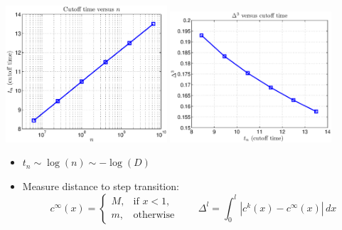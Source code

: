 \documentclass[12pt,t]{beamer}
\begin{document}
\begin{frame}
   \begin{center}
     \includegraphics[width=0.45\textwidth,trim=1cm 1cm 0cm 0cm]{cutofftimevsD2}
     \includegraphics[width=0.45\textwidth,trim=1cm 1cm 0cm 0cm]{areavscutofftime2}
   \end{center}
    \begin{itemize}
    \item $t_n \sim \log(n) \sim -\log(D)$
    \item Measure distance to step transition:
     \begin{equation*}
       c^{\infty}(x) = \begin{cases}
         M, &\text{if } x < 1, \\
         m, &\text{otherwise}
       \end{cases}
      \qquad
      \Delta^l = \int_0^l | c^k(x)-c^{\infty}(x)|\,dx
    \end{equation*}
  \end{itemize}

\end{frame}
\end{document}
